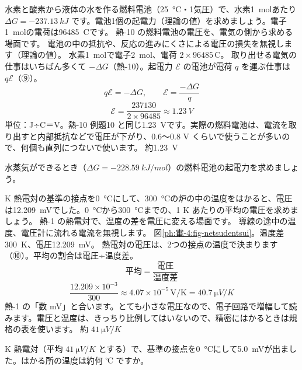 \label{ph:電-4:ex10}
\begin{phreidai}[燃料電池の起電力]
水素と酸素から液体の水を作る燃料電池（\qty{25}{\celsius}・1気圧）で、水素\qty{1}{mol}あたり $\Delta G=\qty{-237.13}{kJ}$ です。電池1個の起電力（理論の値）を求めましょう。電子\qty{1}{mol}の電荷は\qty{96485}{C}です。
\phbamen
熱-10 の燃料電池の電圧を、電気の側から求める場面です。
\phmushi
電池の中の抵抗や、反応の進みにくさによる電圧の損失を無視します（理論の値）。
\phzu
水素\qty{1}{mol}で電子\qty{2}{mol}、電荷 $2\times\num{96485}$\,C。
\phriyu
取り出せる電気の仕事はいちばん多くて $-\Delta G$（熱-10）。起電力 $\mathcal E$ の電池が電荷 $q$ を運ぶ仕事は $q\mathcal E$（⑨）。
\phtateru
\[q\mathcal E=-\Delta G,\qquad\mathcal E=\frac{-\Delta G}{q}\]
\phtoku
\[\mathcal E=\frac{\num{237130}}{2\times\num{96485}}\approx\qty{1.23}{V}\]
\phtashikame
単位：J÷C＝V。熱-10 例題10 と同じ\qty{1.23}{V}です。実際の燃料電池は、電流を取り出すと内部抵抗などで電圧が下がり、0.6〜0.8 V くらいで使うことが多いので、何個も直列につないで使います。
\kotae 約\qty{1.23}{V}
\end{phreidai}
\begin{jibun}
水蒸気ができるとき（$\Delta G=\qty{-228.59}{kJ/mol}$）の燃料電池の起電力を求めましょう。
\end{jibun}

\label{ph:電-4:ex11}
\begin{phreidai}[K 熱電対の電圧]
K 熱電対の基準の接点を\qty{0}{\celsius}にして、\qty{300}{\celsius}の炉の中の温度をはかると、電圧は\qty{12.209}{mV}でした。\qty{0}{\celsius}から\qty{300}{\celsius}までの、1 K あたりの平均の電圧を求めましょう。
\phbamen
熱-1 の熱電対で、温度の差を電圧に変える場面です。
\phmushi
導線の途中の温度、電圧計に流れる電流を無視します。
\phzu
図\ref{ph:電-4:fig-netsudentsui}。温度差\qty{300}{K}、電圧\qty{12.209}{mV}。
\phriyu
熱電対の電圧は、2つの接点の温度で決まります（⑩）。平均の割合は電圧÷温度差。
\phtateru
\[\text{平均}=\frac{\text{電圧}}{\text{温度差}}\]
\phtoku
\[\frac{12.209\times10^{-3}}{300}\approx4.07\times10^{-5}\,\text{V/K}=\qty{40.7}{\micro V/K}\]
\phtashikame
熱-1 の「数 mV」と合います。とても小さな電圧なので、電子回路で増幅して読みます。電圧と温度は、きっちり比例してはいないので、精密にはかるときは規格の表を使います。
\kotae 約 $\qty{41}{\micro V/K}$
\end{phreidai}
\begin{jibun}
K 熱電対（平均 $\qty{41}{\micro V/K}$ とする）で、基準の接点を\qty{0}{\celsius}にして\qty{5.0}{mV}が出ました。はかる所の温度は約何 ℃ ですか。
\end{jibun}

